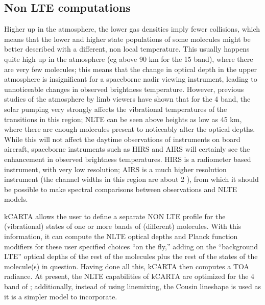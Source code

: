 \documentclass[12pt]{article}
\newcommand{\kc}{\textsf{kCARTA}\xspace}
\begin{document}
{{{{\subsection{Non LTE computations}
Higher up in the atmosphere, the lower gas densities imply fewer collisions, 
which means that the lower and higher state populations of some molecules 
might be better described with a different, non local temperature. This 
usually happens quite high up in the atmosphere (eg above 90 km for the 15 \um
\cd band), where there are very few molecules; this means that the change in 
optical depth in the upper atmosphere is insignificant for a spaceborne 
nadir viewing instrument, leading to unnoticeable changes in observed 
brightness temperature. However, previous studies of the atmosphere by limb 
viewers have shown that for the 4 \um \cd band, the solar pumping very strongly
affects the vibrational temperatures of the transitions in this region; NLTE
can be seen above heights as low as 45 km, where there are enough molecules
present to noticeably alter the optical depths. While this will not affect the 
daytime observations of instruments on board aircraft, spaceborne instruments
such as HIRS and AIRS will certainly see the enhancement in observed brightness
temperatures. HIRS is a radiometer based instrument, with very low resolution;
AIRS is a much higher resolution instrument (the channel widths in this region
are about 2 \wn), from which it should be possible to make spectral 
comparisons between observations and NLTE models.

\kc allows the user to define a separate NON LTE profile for the (vibrational) 
states of one or more bands of (different) molecules. With this information, 
it can compute the NLTE optical depths and Planck function modifiers for 
these user specified choices ``on the fly,'' adding on the ``background LTE'' 
optical depths of the rest of the molecules plus the rest of the states of 
the molecule(s) in question. Having done all this, \kc then computes a 
TOA radiance. At present, the NLTE capabilities of \kc are optimized for the 
4 \um band of \cd; additionally, instead of using linemixing, the Cousin 
lineshape is used as it is a simpler model to incorporate.

}}}}
\end{document}
